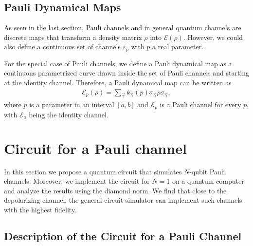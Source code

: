 \documentclass[10pt,letterpaper]{article} %
\newcommand{\fref}[1]{Fig~\ref{#1}}
\newcommand{\eref}[1]{Eq~(\ref{#1})}
\begin{document}
\subsection{Pauli Dynamical Maps} %
\label{subsec: Pauli Dynamical Maps}


As seen in the last section, Pauli channels and in 
general quantum channels are discrete maps
that transform a density matrix $\rho$ into $\mathcal{E}(\rho)$.
However, we could also define a continuous set of 
channels $\varepsilon_p$ with $p$ a real parameter.

For the special case of Pauli channels, we define 
a Pauli dynamical map as a continuous parametrized 
curve drawn inside the set of Pauli channels and starting at the identity channel. 
Therefore, a Pauli dynamical map can be written as
\begin{eqnarray}
\label{eq: Pauli dynamical map}
\mathcal{E}_p(\rho) = \sum_{\vec{\gamma}} k_{\vec{\gamma}}(p) \sigma_{\vec{\gamma}} \rho \sigma_{\vec{\gamma}},
\end{eqnarray}
where $p$ is a parameter in an interval $[a,b]$ 
and $\mathcal{E}_p$ is a Pauli channel for every $p$, 
with $\mathcal{E}_a$ being the identity channel.

\section{Circuit for a Pauli channel} %
\label{sec: Circuit for a Pauli Channel}

In this section we propose a quantum circuit that simulates $N$-qubit Pauli
channels.  Moreover, we implement the circuit for $N=1$ on a quantum computer
and analyze the results using the diamond norm.
We find that close to the depolarizing channel, the general circuit simulator 
can implement such channels with the highest fidelity. 
\subsection{Description of the Circuit for a Pauli Channel} %
\label{subsec: Description of the circuit}




\end{document}
